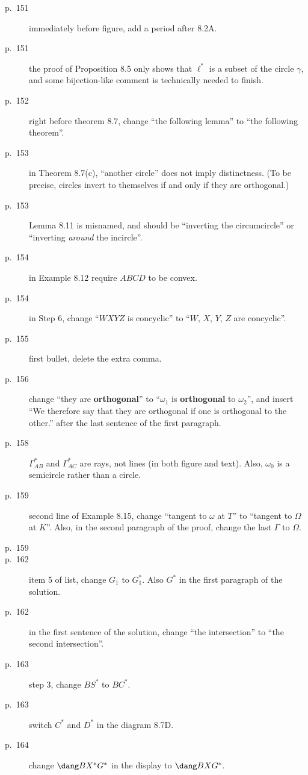 \documentclass[11pt]{scrartcl}
\begin{document}
\begin{description}
\item[p.\  151] immediately before figure, add a period after 8.2A.
\item[p.\  151] the proof of Proposition 8.5 only shows that $\ell^\ast$ is a subset of the circle
  $\gamma$, and some bijection-like comment is technically needed to finish.
\item[p.\  152] right before theorem 8.7,
  change ``the following lemma'' to ``the following theorem''.
\item[p.\  153] in Theorem 8.7(c), ``another circle'' does not imply distinctness.
  (To be precise, circles invert to themselves if and only if they are orthogonal.)
\item[p.\  153] Lemma 8.11 is misnamed, and should be ``inverting the circumcircle''
  or ``inverting \emph{around} the incircle''.
\item[p.\  154] in Example 8.12 require $ABCD$ to be convex.
\item[p.\  154] in Step 6, change ``$WXYZ$ is concyclic'' to ``$W$, $X$, $Y$, $Z$ are concyclic''.
\item[p.\  155] first bullet, delete the extra comma.
\item[p.\  156] change ``they are \textbf{orthogonal}'' to ``$\omega_1$ is \textbf{orthogonal} to $\omega_2$'',
  and insert ``We therefore say that they are orthogonal if one is orthogonal to the other.'' after the last sentence of the first paragraph.
\item[p.\  158] $\Gamma_{AB}^\ast$ and $\Gamma_{AC}^\ast$ are rays, not lines (in both figure and text).
  Also, $\omega_0$ is a semicircle rather than a circle.
\item[p.\  159] second line of Example 8.15,
  change ``tangent to $\omega$ at $T$'' to ``tangent to $\Omega$ at $K$''.
  Also, in the second paragraph of the proof, change the last $\Gamma$ to $\Omega$.
\item[p.\  159] 
\item[p.\  162] item 5 of list, change $G_1$ to $G_1^\ast$.
  Also $G^\ast$ in the first paragraph of the solution.
\item[p.\  162] in the first sentence of the solution,
  change ``the intersection'' to ``the second intersection''.
\item[p.\  163] step 3, change $BS^\ast$ to $BC^\ast$.
\item[p.\  163] switch $C^\ast$ and $D^\ast$ in the diagram 8.7D.
\item[p.\  164] change $\dang BX^\ast G^\ast$ in the display to $\dang BXG^\ast$.

\end{description}
\end{document}
